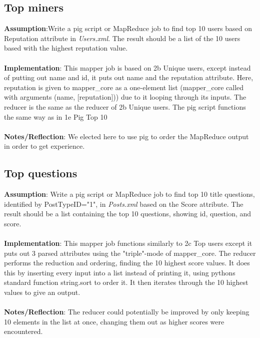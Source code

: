 \documentclass[fleqn,10pt]{wlscirep}
\begin{document}
\subsection{Top miners}
\textbf{Assumption}:Write a pig script or MapReduce job to find top 10 users based on Reputation attribute in \textit{Users.xml}. The result should be a list of the 10 users based with the highest reputation value. \\ \\
\textbf{Implementation}: This mapper job is based on 2b Unique users, except instead of putting out name and id, it puts out name and the reputation attribute. Here, reputation is given to mapper\_core as a one-element list (mapper\_core called with arguments (name, [reputation])) due to it looping through its inputs. The reducer is the same as the reducer of 2b Unique users. The pig script functions the same way as in 1e Pig Top 10\\ \\
\textbf{Notes/Reflection}: We elected here to use pig to order the MapReduce output in order to get experience.


\subsection{Top questions}
\textbf{Assumption}: Write a pig script or MapReduce job to find top 10 title questions, identified by PostTypeID="1", in \textit{Posts.xml} based on the Score attribute. The result should be a list containing the top 10 questions, showing id, question, and score.\\ \\
\textbf{Implementation}: This mapper job functions similarly to 2c Top users except it puts out 3 parsed attributes using the "triple"-mode of mapper\_core. The reducer performs the reduction and ordering, finding the 10 highest score values. It does this by inserting every input into a list instead of printing it, using pythons standard function string.sort to order it. It then iterates through the 10 highest values to give an output.\\ \\
\textbf{Notes/Reflection}: The reducer could potentially be improved by only keeping 10 elements in the list at once, changing them out as higher scores were encountered.

\end{document}
